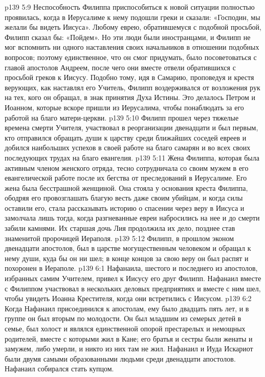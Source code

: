 \vs p139 5:9 Неспособность Филиппа приспособиться к новой ситуации полностью проявилась, когда в Иерусалиме к нему подошли греки и сказали: «Господин, мы желали бы видеть Иисуса». Любому еврею, обратившемуся с подобной просьбой, Филипп сказал бы: «Пойдем». Но эти люди были иностранцами, и Филипп не мог вспомнить ни одного наставления своих начальников в отношении подобных вопросов; поэтому единственное, что он смог придумать, было посоветоваться с главой апостолов Андреем, после чего они вместе отвели обратившихся с просьбой греков к Иисусу. Подобно тому, идя в Самарию, проповедуя и крестя верующих, как наставлял его Учитель, Филипп воздерживался от возложения рук на тех, кого он обращал, в знак принятия Духа Истины. Это делалось Петром и Иоанном, которые вскоре пришли из Иерусалима, чтобы понаблюдать за его работой на благо матери\hyp{}церкви.
\vs p139 5:10 Филипп прошел через тяжелые времена смерти Учителя, участвовал в реорганизации двенадцати и был первым, кто отправился обращать души к царству среди ближайших соседей евреев и добился наибольших успехов в своей работе на благо самарян и во всех своих последующих трудах на благо евангелия.
\vs p139 5:11 \pc Жена Филиппа, которая была активным членом женского отряда, тесно сотрудничала со своим мужем в его евангелической работе после их бегства от преследований в Иерусалиме. Его жена была бесстрашной женщиной. Она стояла у основания креста Филиппа, ободряя его провозглашать благую весть даже своим убийцам, и когда силы оставили его, стала рассказывать историю о спасении через веру в Иисуса и замолчала лишь тогда, когда разгневанные евреи набросились на нее и до смерти забили камнями. Их старшая дочь Лия продолжила их дело, позднее став знаменитой пророчицей Иераполя.
\vs p139 5:12 \pc Филипп, в прошлом эконом двенадцати апостолов, был в царстве могущественным человеком и обращал к нему души, куда бы он ни шел; в конце концов за свою веру он был распят и похоронен в Иераполе.
\vs p139 6:1 Нафанаила, шестого и последнего из апостолов, избранных самим Учителем, привел к Иисусу его друг Филипп. Нафанаил вместе с Филиппом участвовал в нескольких деловых предприятиях и вместе с ним шел, чтобы увидеть Иоанна Крестителя, когда они встретились с Иисусом.
\vs p139 6:2 Когда Нафанаил присоединился к апостолам, ему было двадцать пять лет, и в группе он был вторым по молодости. Он был младшим из семерых детей в семье, был холост и являлся единственной опорой престарелых и немощных родителей, вместе с которыми жил в Кане; его братья и сестры были женаты и замужем, либо умерли, и никто из них там не жил. Нафанаил и Иуда Искариот были двумя самыми образованными людьми среди двенадцати апостолов. Нафанаил собирался стать купцом.
